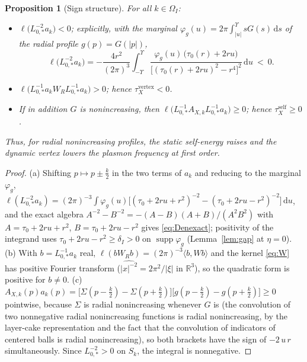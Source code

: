 \documentclass[11pt,a4paper]{amsart}
\newtheorem{proposition}[theorem]{Proposition}
\theoremstyle{definition}
\theoremstyle{remark}
\newcommand{\R}{\mathbb{R}}
\newcommand{\supp}{\operatorname{supp}}
\newcommand{\dd}{\,\mathrm{d}}
\newcommand{\ellf}{\ell}
\begin{document}
\begin{proposition}[Sign structure]\label{prop:signs}
For all $k\in\Omega_I$:
\begin{itemize}
\item[(a)] $\ellf\bigl(L_{0,*}^{-2}a_k\bigr)<0$; explicitly, with the marginal $\varphi_g(u)=2\pi\int_{|u|}^{\Upsilon}sG(s)\dd s$ of the radial profile $g(p)=G(|p|)$,
\begin{equation}\label{eq:Denexact}
\ellf\bigl(L_{0,*}^{-2}a_k\bigr)
=-\frac{4r^2}{(2\pi)^{3}}\int_{-\Upsilon}^{\Upsilon}\frac{\varphi_g(u)\,\bigl(\tau_0(r)+2ru\bigr)}
{\bigl[(\tau_0(r)+2ru)^2-r^4\bigr]^{2}}\dd u\ <\ 0 .
\end{equation}
\item[(b)] $\ellf\bigl(L_{0,*}^{-1}a_kW_RL_{0,*}^{-1}a_k\bigr)>0$; hence $\tau_X^{\mathrm{vertex}}<0$.
\item[(c)] If in addition $G$ is nonincreasing, then $\ellf\bigl(L_{0,*}^{-1}A_{X,k}L_{0,*}^{-1}a_k\bigr)\ge0$; hence $\tau_X^{\mathrm{self}}\ge0$.
\end{itemize}
Thus, for radial nonincreasing profiles, the static self-energy raises and the dynamic vertex lowers the plasmon frequency at first order.
\end{proposition}

\begin{proof}
(a) Shifting $p\mapsto p\pm\frac k2$ in the two terms of $a_k$ and reducing to the marginal $\varphi_g$,
$\ellf(L_{0,*}^{-2}a_k)=(2\pi)^{-3}\int\varphi_g(u)\bigl[(\tau_0+2ru+r^2)^{-2}-(\tau_0+2ru-r^2)^{-2}\bigr]\dd u$,
and the exact algebra $A^{-2}-B^{-2}=-(A-B)(A+B)/(A^2B^2)$ with $A=\tau_0+2ru+r^2$, $B=\tau_0+2ru-r^2$ gives \eqref{eq:Denexact}; positivity of the integrand uses $\tau_0+2ru-r^2\ge\delta_I>0$ on $\supp\varphi_g$ (Lemma~\ref{lem:gap} at $\eta=0$).
(b) With $b=L_{0,*}^{-1}a_k$ real,
$\ellf(bW_Rb)=(2\pi)^{-3}\langle b,Wb\rangle$ and the kernel \eqref{eq:W} has positive Fourier transform ($\widehat{|x|^{-2}}=2\pi^2/|\xi|$ in $\R^3$), so the quadratic form is positive for $b\ne0$.
(c) $A_{X,k}(p)a_k(p)=\bigl[\Sigma(p-\tfrac k2)-\Sigma(p+\tfrac k2)\bigr]\bigl[g(p-\tfrac k2)-g(p+\tfrac k2)\bigr]\ge0$ pointwise, because $\Sigma$ is radial nonincreasing whenever $G$ is (the convolution of two nonnegative radial nonincreasing functions is radial nonincreasing, by the layer-cake representation and the fact that the convolution of indicators of centered balls is radial nonincreasing), so both brackets have the sign of $-2\,u\,r$ simultaneously. Since $L_{0,*}^{-2}>0$ on $S_k$, the integral is nonnegative.
\end{proof}
\end{document}
